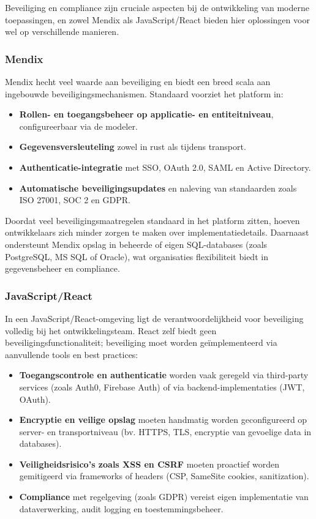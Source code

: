 Beveiliging en compliance zijn cruciale aspecten bij de ontwikkeling van moderne toepassingen, en zowel Mendix als JavaScript/React bieden hier oplossingen voor wel  op verschillende manieren.

\subsubsection{Mendix}

Mendix hecht veel waarde aan beveiliging en biedt een breed scala aan ingebouwde beveiligingsmechanismen. Standaard voorziet het platform in:
\begin{itemize}
    \item \textbf{Rollen- en toegangsbeheer op applicatie- en entiteitniveau}, configureerbaar via de modeler.
    \item \textbf{Gegevensversleuteling} zowel in rust als tijdens transport.
    \item \textbf{Authenticatie-integratie} met SSO, OAuth 2.0, SAML en Active Directory.
    \item \textbf{Automatische beveiligingsupdates} en naleving van standaarden zoals ISO 27001, SOC 2 en GDPR.
\end{itemize}

Doordat veel beveiligingsmaatregelen standaard in het platform zitten, hoeven ontwikkelaars zich minder zorgen te maken over implementatiedetails. Daarnaast ondersteunt Mendix opslag in beheerde of eigen SQL-databases (zoals PostgreSQL, MS SQL of Oracle), wat organisaties flexibiliteit biedt in gegevensbeheer en compliance.

\subsubsection{JavaScript/React}

In een JavaScript/React-omgeving ligt de verantwoordelijkheid voor beveiliging volledig bij het ontwikkelingsteam. React zelf biedt geen beveiligingsfunctionaliteit; beveiliging moet worden geïmplementeerd via aanvullende tools en best practices:
\begin{itemize}
    \item \textbf{Toegangscontrole en authenticatie} worden vaak geregeld via third-party services (zoals Auth0, Firebase Auth) of via backend-implementaties (JWT, OAuth).
    \item \textbf{Encryptie en veilige opslag} moeten handmatig worden geconfigureerd op server- en transportniveau (bv. HTTPS, TLS, encryptie van gevoelige data in databases).
    \item \textbf{Veiligheidsrisico’s zoals XSS en CSRF} moeten proactief worden gemitigeerd via frameworks of headers (CSP, SameSite cookies, sanitization).
    \item \textbf{Compliance} met regelgeving (zoals GDPR) vereist eigen implementatie van dataverwerking, audit logging en toestemmingsbeheer.
\end{itemize}

